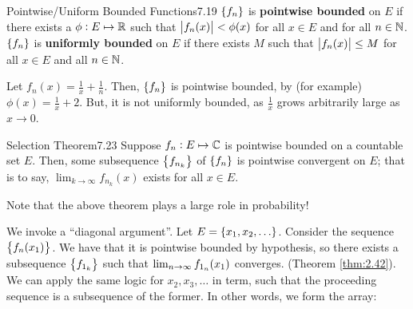 \setcounter{rudin}{18}

\begin{definition}{Pointwise/Uniform Bounded Functions}{7.19}
    $\set{f_n}$ is \textbf{pointwise bounded} on $E$ if there exists a $\phi: E \mapsto \mathbb{R}$ such that $\abs{f_n(x)} < \phi(x)$ for all $x \in E$ and for all $n \in \mathbb{N}$. $\set{f_n}$ is \textbf{uniformly bounded} on $E$ if there exists $M$ such that $\abs{f_n(x)} \leq M$ for all $x \in E$ and all $n \in \mathbb{N}$.
\end{definition}

\begin{nexample}{}{}
    Let $f_n(x) = \frac{1}{x} + \frac{1}{n}$. Then, $\set{f_n}$ is pointwise bounded, by (for example) $\phi(x) = \frac{1}{x} + 2$. But, it is not uniformly bounded, as $\frac{1}{x}$ grows arbitrarily large as $x \rightarrow 0$. 
\end{nexample}

\setcounter{rudin}{22}
\begin{theorem}{Selection Theorem}{7.23}
    Suppose $f_n : E \mapsto \mathbb{C}$ is pointwise bounded on a countable set $E$. Then, some subsequence $\set{f_{n_k}}$ of $\set{f_n}$ is pointwise convergent on $E$; that is to say, $\lim_{k \rightarrow \infty} f_{n_k}(x)$ exists for all $x \in E$. 
\end{theorem}
\noindent Note that the above theorem plays a large role in probability!

\begin{nproof}
    We invoke a ``diagonal argument''. Let $E = \set{x_1, x_2, \ldots}$. Consider the sequence $\set{f_n(x_1)}$. We have that it is pointwise bounded by hypothesis, so there exists a subsequence $\set{f_{1_k}}$ such that $\lim_{n \rightarrow \infty} f_{1_n}(x_1)$ converges. (Theorem \ref{thm:2.42}). We can apply the same logic for $x_2, x_3, \ldots$ in term, such that the proceeding sequence is a subsequence of the former. In other words, we form the array:

\end{nproof}


